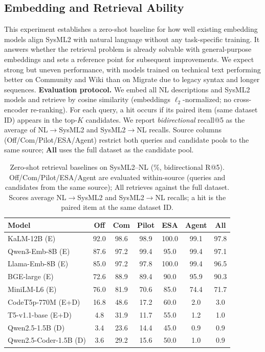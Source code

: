 \documentclass{article}
\begin{document}
\subsection{Embedding and Retrieval Ability}
This experiment establishes a zero-shot baseline for how well existing embedding models align SysML2 with natural language without any task-specific training. It answers whether the retrieval problem is already solvable with general-purpose embeddings and sets a reference point for subsequent improvements. We expect strong but uneven performance, with models trained on technical text performing better on Community and Wiki than on Migrate due to legacy syntax and longer sequences.
\textbf{Evaluation protocol.} We embed all NL descriptions and SysML2 models and retrieve by cosine similarity (embeddings $\ell_2$-normalized; no cross-encoder re-ranking). For each query, a hit occurs if its paired item (same dataset ID) appears in the top-$K$ candidates. We report \emph{bidirectional} recall@5 as the average of NL$\rightarrow$SysML2 and SysML2$\rightarrow$NL recalls. Source columns (Off/Com/Pilot/ESA/Agent) restrict both queries and candidate pools to the same source; \textbf{All} uses the full dataset as the candidate pool.
\begin{table}[H]
\centering
\small
\setlength{\tabcolsep}{3pt}
\caption{Zero-shot retrieval baselines on SysML2--NL (\%, bidirectional R@5). Off/Com/Pilot/ESA/Agent are evaluated within-source (queries and candidates from the same source); All retrieves against the full dataset. Scores average NL$\rightarrow$SysML2 and SysML2$\rightarrow$NL recalls; a hit is the paired item at the same dataset ID.}
\label{tab:sota-embeddings}
\begin{tabular}{lcccccc}
\toprule
Model & Off & Com & Pilot & ESA & Agent & All \\
\midrule
KaLM-12B (E) & 92.0 & 98.6 & 98.9 & 100.0 & 99.1 & 97.8 \\
Qwen3-Emb-8B (E) & 87.6 & 97.2 & 99.4 & 95.0 & 99.4 & 97.1 \\
Llama-Emb-8B (E) & 85.0 & 97.2 & 97.8 & 100.0 & 99.4 & 96.5 \\
BGE-large (E) & 72.6 & 88.9 & 89.4 & 90.0 & 95.9 & 90.3 \\
MiniLM-L6 (E) & 76.0 & 81.9 & 70.6 & 85.0 & 74.4 & 71.7 \\
\midrule
CodeT5p-770M (E+D) & 16.8 & 48.6 & 17.2 & 60.0 & 2.0 & 3.0 \\
T5-v1.1-base (E+D) & 4.8 & 31.9 & 11.7 & 55.0 & 1.2 & 1.0 \\
\midrule
Qwen2.5-1.5B (D) & 3.4 & 23.6 & 14.4 & 45.0 & 0.9 & 0.9 \\
Qwen2.5-Coder-1.5B (D) & 3.6 & 29.2 & 15.6 & 50.0 & 1.0 & 0.9 \\
\bottomrule
\end{tabular}
\end{table}
\end{document}
